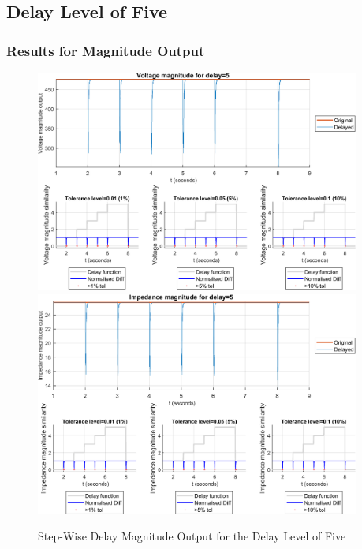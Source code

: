 \subsection{Delay Level of Five}
\subsubsection{Results for Magnitude Output}

\begin{figure}
    \caption{Step-Wise Delay Magnitude Output for the Delay Level of Five}
    \includegraphics[width=0.95\textwidth]{PMUsim-figures/DelayOf_5/Step_vMagnitude.png}    
      \includegraphics[width=0.95\textwidth]{PMUsim-figures/DelayOf_5/Step_iMagnitude.png}      
    \label{fig:PMUsimStep_Five_Magnitude}
    \begin{small}
     \end{small}
\end{figure}

